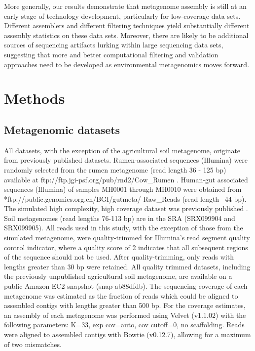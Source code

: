 \documentclass[10pt]{article}
\begin{document}
More generally, our results demonstrate that metagenome assembly is
still at an early stage of technology development, particularly for
low-coverage data sets.  Different assemblers and different filtering
techniques yield substantially different assembly statistics on these
data sets.  Moreover, there are likely to be additional sources of
sequencing artifacts lurking within large sequencing data sets,
suggesting that more and better computational filtering and validation
approaches need to be developed as environmental metagenomics moves
forward.

\section*{Methods}

\subsection*{Metagenomic datasets}
All datasets, with the exception of the agricultural soil metagenome,
originate from previously published datasets. Rumen-associated
sequences (Illumina) were randomly selected from the rumen metagenome (read length 36 - 125 bp)
available at ftp://ftp.jgi-psf.org/pub/rnd2/Cow\_Rumen
\cite{Hess:2011p686}. Human-gut associated sequences (Illumina) of
samples MH0001 through MH0010 were obtained from 
\\*ftp://public.genomics.org.cn/BGI/gutmeta/ Raw\_Reads
\cite{Qin:2010p189} (read length ~44 bp).  The simulated high complexity, high coverage
dataset was previously published \cite{Pignatelli:2011p742}.  Soil metagenomes (read lengths 76-113 bp) are in the SRA (SRX099904 and SRX099905). All
reads used in this study, with the exception of those from the simulated
metagenome, were quality-trimmed for Illumina's read segment quality
control indicator, where a quality score of 2 indicates that all
subsequent regions of the sequence should not be used. After
quality-trimming, only reads with lengths greater than 30 bp were
retained. All quality trimmed datasets, including the previously
unpublished agricultural soil metagenome, are available on a public
Amazon EC2 snapshot (snap-ab88dfdb).  The sequencing coverage of each
metagenome was estimated as the fraction of reads which could be
aligned to assembled contigs with lengths greater than 500 bp.  For
the coverage estimates, an assembly of each metagenome was performed
using Velvet (v1.1.02) with the following parameters: K=33, exp
cov=auto, cov cutoff=0, no scaffolding.  Reads were aligned to
assembled contigs with Bowtie (v0.12.7), allowing for a maximum of two
mismatches.
\end{document}
